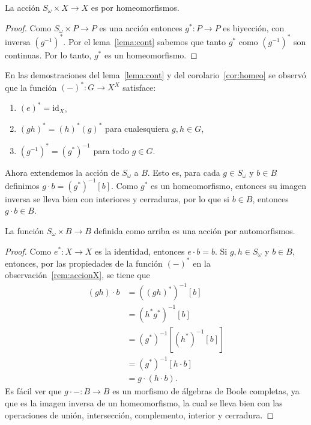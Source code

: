 \documentclass[letterpaper,DIV=15,12pt]{scrartcl}
\newcommand{\id}{\mathrm{id}}                              %
\begin{document}
\begin{corollary}[label=cor:homeo]
    La acción \(S_{\omega}\times X\to X\) es por homeomorfismos.
\end{corollary}
\begin{proof}
    Como \(S_{\omega}\times P\to P\) es una acción entonces \(g^*\colon P\to P\)
    es biyección, con inversa \((g^{-1})^*\). Por el lema~\ref{lema:cont}
    sabemos que tanto \(g^*\) como \((g^{-1})^*\) son continuas. Por lo tanto,
    \(g^*\) es un homeomorfismo.
\end{proof}

\begin{remark}[label=rem:accionX]
    En las demostraciones del lema~\ref{lema:cont} y del
    corolario~\ref{cor:homeo} se observó que la función \((-)^*\colon G\to X^X\)
    satisface:
    \begin{enumerate}
        \item \((e)^*=\id_X\),
        \item \((gh)^*=(h)^*(g)^*\) para cualesquiera \(g,h\in G\),
        \item \((g^{-1})^*=(g^*)^{-1}\) para todo \(g\in G\).
    \end{enumerate}
\end{remark}

Ahora extendemos la acción de \(S_{\omega}\) a \(B\). Esto es, para cada \(g\in
S_{\omega}\) y \(b\in B\) definimos \(g\cdot b=(g^*)^{-1}[b]\). Como \(g^*\) es
un homeomorfismo, entonces su imagen inversa se lleva bien con interiores y
cerraduras, por lo que si \(b\in B\), entonces \(g\cdot b\in B\).

\begin{lemma}
    La función \(S_{\omega}\times B\to B\) definida como arriba es
    una acción por automorfismos.
\end{lemma}
\begin{proof}
    Como \(e^*\colon X \to X\) es la identidad, entonces \(e\cdot b=b\). Si
    \(g,h\in S_{\omega}\) y \(b\in B\), entonces, por las propiedades de la
    función \((-)^*\) en la observación~\ref{rem:accionX}, se tiene que
    \begin{align*}
        (gh)\cdot b&=((gh)^*)^{-1}[b] \\
        &=(h^*g^*)^{-1}[b] \\
        &=(g^*)^{-1}[(h^*)^{-1}[b]] \\
        &=(g^*)^{-1}[h\cdot b] \\
        &=g\cdot(h\cdot b).
    \end{align*}
    Es fácil ver que \(g\cdot-\colon B\to B\) es un morfismo de álgebras de
    Boole completas, ya que es la imagen inversa de un homeomorfismo, la cual se
    lleva bien con las operaciones de unión, intersección, complemento, interior
    y cerradura.
\end{proof}
\end{document}

